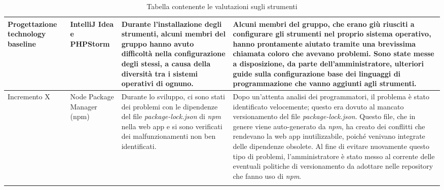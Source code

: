 \begin{center}
\begin{longtable}{|p{2.5cm}|p{2.5cm}|p{5cm}|p{5cm}|}
				\hline
				Progettazione technology baseline
				&
				IntelliJ Idea e PHPStorm
				&
				Durante l'installazione degli strumenti, alcuni membri del gruppo hanno avuto difficoltà nella configurazione degli stessi, a causa della diversità tra i sistemi operativi di ognuno.
				&
				Alcuni membri del gruppo, che erano giù riusciti a configurare gli strumenti nel proprio sistema operativo, hanno prontamente aiutato tramite una brevissima chiamata \glock{Discord} coloro che avevano problemi. Sono state messe a disposizione, da parte dell'amministratore, ulteriori guide sulla configurazione base dei linguaggi di programmazione che vanno aggiunti agli strumenti. \\
				
				\hline
				Incremento X
				&
				Node Package Manager (npm)
				&
				Durante lo sviluppo, ci sono stati dei problemi con le dipendenze del file \textit{package-lock.json} di \textit{npm} nella web app e si sono verificati dei malfunzionamenti non ben identificati.
				&
				Dopo un'attenta analisi dei programmatori, il problema è stato identificato velocemente; questo era dovuto al mancato versionamento del file \textit{package-lock.json}. Questo file, che in genere viene auto-generato da \textit{npm}, ha creato dei conflitti che rendevano la web app inutilizzabile, poiché venivano integrate delle dipendenze obsolete. Al fine di evitare nuovamente questo tipo di problemi, l'amministratore è stato messo al corrente delle eventuali politiche di versionamento da adottare nelle repository che fanno uso di \textit{npm}.  \\
				
				\hline

				\caption{Tabella contenente le valutazioni sugli strumenti}
			
			\end{longtable}
		\end{center}
